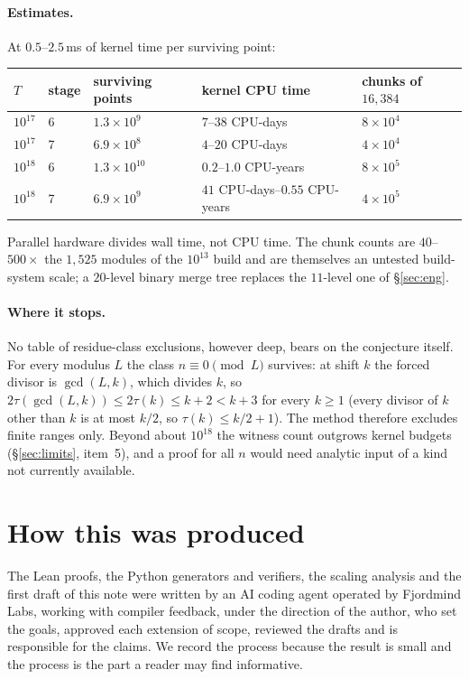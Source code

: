 \documentclass[11pt]{article}
\begin{document}
\paragraph{Estimates.} At $0.5$--$2.5$\,ms of kernel time per surviving point:
\begin{center}
\begin{tabular}{@{}lllll@{}}
\toprule
$T$ & stage & surviving points & kernel CPU time & chunks of $16{,}384$\\
\midrule
$10^{17}$ & 6 & $1.3\times10^{9}$ & $7$--$38$ CPU-days & $8\times10^{4}$\\
$10^{17}$ & 7 & $6.9\times10^{8}$ & $4$--$20$ CPU-days & $4\times10^{4}$\\
$10^{18}$ & 6 & $1.3\times10^{10}$ & $0.2$--$1.0$ CPU-years & $8\times10^{5}$\\
$10^{18}$ & 7 & $6.9\times10^{9}$ & $41$ CPU-days--$0.55$ CPU-years & $4\times10^{5}$\\
\bottomrule
\end{tabular}
\end{center}
Parallel hardware divides wall time, not CPU time. The chunk counts are $40$--$500\times$ the $1{,}525$ modules of the $10^{13}$ build and are themselves an untested build-system scale; a $20$-level binary merge tree replaces the $11$-level one of \S\ref{sec:eng}.

\paragraph{Where it stops.} No table of residue-class exclusions, however deep, bears on the conjecture itself. For every modulus $L$ the class $n\equiv0\pmod L$ survives: at shift $k$ the forced divisor is $\gcd(L,k)$, which divides $k$, so $2\tau(\gcd(L,k))\le2\tau(k)\le k+2<k+3$ for every $k\ge1$ (every divisor of $k$ other than $k$ is at most $k/2$, so $\tau(k)\le k/2+1$). The method therefore excludes finite ranges only. Beyond about $10^{18}$ the witness count outgrows kernel budgets (\S\ref{sec:limits}, item~5), and a proof for all $n$ would need analytic input of a kind not currently available.

\section{How this was produced}\label{sec:process}

The Lean proofs, the Python generators and verifiers, the scaling analysis and the first draft of this note were written by an AI coding agent operated by Fjordmind Labs, working with compiler feedback, under the direction of the author, who set the goals, approved each extension of scope, reviewed the drafts and is responsible for the claims. We record the process because the result is small and the process is the part a reader may find informative.
\end{document}
